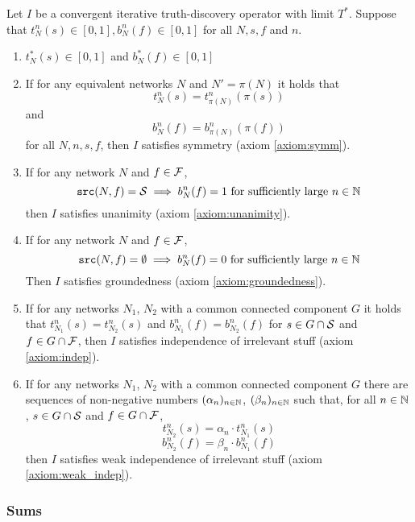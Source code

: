 \documentclass[../main.tex]{subfiles}
\begin{document}
\begin{lemma}
\label{lemma:iterative_axiom_suff_conds}
Let $I$ be a convergent iterative truth-discovery operator with limit
$T^*$. Suppose that $t_N^n(s) \in [0, 1], b_N^n(f) \in [0, 1]$ for all $N, s,
f$ and $n$.

\begin{enumerate}
    \item $t_N^*(s) \in [0, 1]$ and $b_N^*(f) \in [0, 1]$

    \item If for any equivalent networks $N$ and $N'=\pi(N)$ it holds that
    \[
        t_N^n(s) = t_{\pi(N)}^n(\pi(s))
    \]
    and
    \[
        b_N^n(f) = b_{\pi(N)}^n(\pi(f))
    \]
    for all $N, n, s, f$, then $I$ satisfies symmetry (axiom \ref{axiom:symm}).

    \item If for any network $N$ and $f \in \F$,
    \[
        \src(N, f) = \S \implies b_N^n(f) = 1 \text{ for sufficiently large }
            n \in \Nat
    \]
    then $I$ satisfies unanimity (axiom \ref{axiom:unanimity}).

    \item If for any network $N$ and $f \in \F$,
    \[
        \src(N, f) = \emptyset \implies b_N^n(f) = 0
            \text{ for sufficiently large } n \in \Nat
    \]
    Then $I$ satisfies groundedness (axiom \ref{axiom:groundedness}).

    \item If for any networks $N_1$, $N_2$ with a common connected component
    $G$ it holds that $t_{N_1}^n(s) = t_{N_2}^n(s)$ and $b_{N_1}^n(f) =
    b_{N_2}^n(f)$ for $s \in G \cap \S$ and $f \in G \cap \F$, then $I$
    satisfies independence of irrelevant stuff (axiom \ref{axiom:indep}).

    \item If for any networks $N_1$, $N_2$ with a common connected component
    $G$ there are sequences of non-negative numbers $(\alpha_n)_{n \in \Nat}$,
    $(\beta_n)_{n \in \Nat}$ such that, for all $n \in \Nat$, $s \in G \cap \S$
    and $f \in G \cap \F$,
        \[ t_{N_2}^n(s) = \alpha_n \cdot t_{N_1}^n(s) \]
        \[ b_{N_2}^n(f) = \beta_n \cdot b_{N_1}^n(f) \]
    then $I$ satisfies weak independence of irrelevant stuff (axiom
    \ref{axiom:weak_indep}).

\end{enumerate}
\end{lemma}

\subsubsection{Sums}
\end{document}
